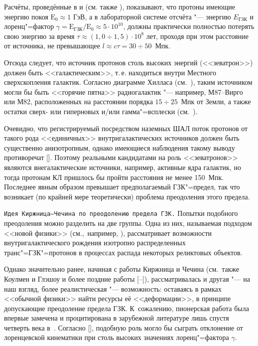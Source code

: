 Расчёты, проведённые в \cite{Rudoy:GREISEN} и \cite{Rudoy:ZACEPIN} (см. также \cite{Rudoy:STECKER}), показывают, что протоны
имеющие энергию покоя $\textrm{E}_0\approx1$ ГэВ, а в лабораторной системе отсчёта "--- энергию $E_{\textrm{ГЗК}}$ и
лоренц"=фактор \mbox{$\gamma=\textrm{E}_{\textrm{ГЗК}}/\textrm{E}_0\approx5\cdot10^{10}$,} должны практически полностью потерять свою
энергию за время $\tau\approx(1,0 \div 1,5)\cdot10^8$ лет, проходя при этом расстояние от источника, не превышающее  $l\approx
c\tau=30\div50$~Мпк.

Отсюда следует, что источник протонов столь высоких энергий (<<зеватрон>>) должен быть <<галактическим>>, т.\,е. находиться
внутри Местного сверхскопления галактик. Согласно диаграмме Хилласа (см.~\cite{Rudoy:PANASUK,Rudoy:ZASOV}), таким источником
могли бы быть <<горячие пятна>> радиогалактик "--- например, М87--Вирго или М82, расположенных на расстоянии порядка $15\div25$~Мпк
от Земли, а также остатки сверх- или гиперновых и/или гамма"=всплески (см.~\cite{Rudoy:PTUSKIN}).

Очевидно, что регистрируемый посредством наземных ШАЛ поток протонов от такого рода <<единичных>> внутригалактических источников
должен быть существенно анизотропным, однако имеющиеся наблюдения такому выводу противоречат
[]. Поэтому реальными кандидатами на роль <<зеватронов>> являются внегалактические источники,
например, активные ядра галактик, но тогда протонам КЛ пришлось бы пройти расстояния не менее 150~Мпк. Последнее явным образом
превышает предполагаемый ГЗК"=предел, так что возникает (по крайней мере теоретически) проблема преодоления этого предела.

\smallskip

{\tt Идея Киржница--Чечина по преодолению предела ГЗК.} Попытки подобного преодоления можно разделить на две группы. Одна из
них,  называемая подходом <<новой физики>> (см.,~например, \cite{Rudoy:BEREZINSKIY2}), рассматривает возможности
внутригалактического рождения изотропно распределенных транс"=ГЗК"=протонов в процессах распада некоторых реликтовых объектов.

Однако значительно ранее, начиная с работы Киржница и Чечина \cite{Rudoy:KIRSHNIZ} (см.~также  Коулмен и Глэшоу
\cite{Rudoy:COLEMAN} и более поздние работы [--]), рассматривалась и другая "--- на
наш взгляд, более реалистическая "--- возможность: оставаясь в рамках <<обычной физики>> найти ресурсы её <<деформации>>, в
принципе допускающие преодоление предела ГЗК. К~сожалению, пионерская работа \cite{Rudoy:KIRSHNIZ} была впервые замечена и
процитирована в зарубежной литературе лишь спустя четверть века в~\cite{Rudoy:GONZALEZ}. Согласно
[], подобную роль могло бы сыграть отклонение от лоренцевской кинематики при столь высоких
значениях лоренц"=фактора $\gamma$.

